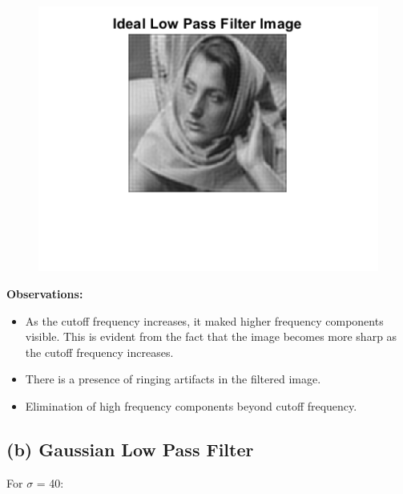 \documentclass{article}
\begin{document}
\begin{figure}[!htb]
\begin{minipage}[b]{0.3\textwidth}
    \end{minipage}
    \begin{minipage}[b]{0.3\textwidth}
        \includegraphics[width=\textwidth]{Filtered_Image_80.png}
    \end{minipage}
\end{figure}

\newpage
\textbf{Observations:} 
\begin{itemize}[noitemsep]
    \item As the cutoff frequency increases, it maked higher frequency components visible. This is evident from the fact that the image becomes more sharp as the cutoff frequency increases.
    \item There is a presence of ringing artifacts in the filtered image.
    \item Elimination of high frequency components beyond cutoff frequency.
\end{itemize}

\subsection*{(b) Gaussian Low Pass Filter}

For $\sigma$ = 40:
\end{document}
